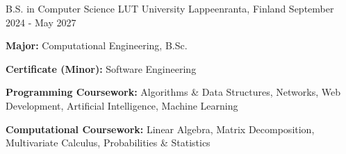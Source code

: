 

\begin{cventries}

  \cventryalt
    {B.S. in Computer Science} %
    {LUT University} %
    {Lappeenranta, Finland} %
    {September 2024 - May 2027} %
    {
      \begin{cvitems} %
        \item {\textbf{Major:} Computational Engineering, B.Sc.}
        \item {\textbf{Certificate (Minor):} Software Engineering}
        \item {\textbf{Programming Coursework:} Algorithms \& Data Structures, Networks, Web Development, Artificial Intelligence, Machine Learning}
        \item {\textbf{Computational Coursework:} Linear Algebra, Matrix Decomposition, Multivariate Calculus, Probabilities \& Statistics}
      \end{cvitems}
    }
\end{cventries}
\vspace{-3.0mm}